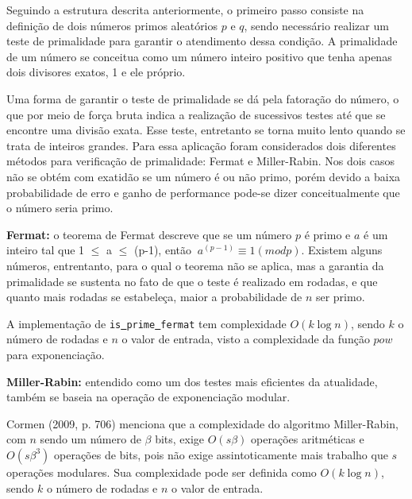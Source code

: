 Seguindo a estrutura descrita anteriormente, o primeiro passo consiste na definição de dois números primos aleatórios $p$ e $q$, sendo necessário realizar um teste de primalidade para garantir o atendimento dessa condição. A primalidade de um número se conceitua como um número inteiro positivo que tenha apenas dois divisores exatos, 1 e ele próprio.

Uma forma de garantir o teste de primalidade se dá pela fatoração do número, o que por meio de força bruta indica a realização de sucessivos testes até que se encontre uma divisão exata. Esse teste, entretanto se torna muito lento quando se trata de inteiros grandes. Para essa aplicação foram considerados dois diferentes métodos para verificação de primalidade: Fermat e Miller-Rabin. Nos dois casos não se obtém com exatidão se um número é ou não primo, porém devido a baixa probabilidade de erro e ganho de performance pode-se dizer conceitualmente que o número seria primo.

\textbf{Fermat:} o teorema de Fermat descreve que se um número $p$ é primo e $a$ é um inteiro tal que 1 $\leq$ a $\leq$ (p-1), então $\ a^{(p-1)} \equiv 1 (mod p)$. Existem alguns números, entrentanto, para o qual o teorema não se aplica, mas a garantia da primalidade se sustenta no fato de que o teste é realizado em rodadas, e que quanto mais rodadas se estabeleça, maior a probabilidade de $n$ ser primo.

A implementação de \texttt{is\underline{ }prime\underline{ }fermat} 
tem complexidade $O(k\log{}n)$, sendo $k$ o número de rodadas e $n$ o valor de entrada, visto a complexidade da função $pow$ para exponenciação.

\textbf{Miller-Rabin:} entendido como um dos testes mais eficientes da atualidade, também se baseia na operação de exponenciação modular. 


Cormen (2009, p. 706) menciona que a complexidade do algoritmo Miller-Rabin, com $n$ sendo um número de $\beta$ bits, exige $O(s\beta)$ operações aritméticas e $O(s\beta^{3})$ operações de bits, pois não exige assintoticamente mais trabalho que $s$ operações modulares. Sua complexidade pode ser definida como $O(k\log{}n)$, sendo $k$ o número de rodadas e $n$ o valor de entrada.
